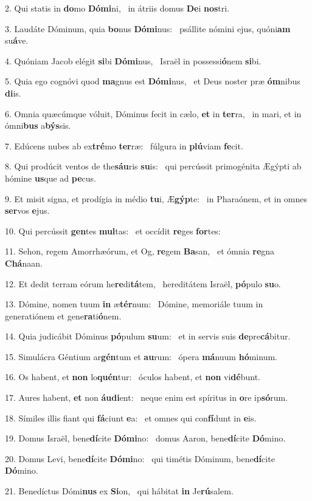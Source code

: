 2. Qui statis in \textbf{do}mo \textbf{Dó}\textbf{mi}ni, \ast\  in átriis domus \textbf{De}i \textbf{nos}tri.\

3. Laudáte Dóminum, quia \textbf{bo}nus \textbf{Dó}\textbf{mi}nus: \ast\  psállite nómini ejus, quóni\textbf{am} su\textbf{á}ve.\

4. Quóniam Jacob elégit \textbf{si}bi \textbf{Dó}\textbf{mi}nus, \ast\  Israël in possessi\textbf{ó}nem \textbf{si}bi.\

5. Quia ego cognóvi quod \textbf{ma}gnus est \textbf{Dó}\textbf{mi}nus, \ast\  et Deus noster præ \textbf{óm}nibus \textbf{di}is.\

6. Omnia quæcúmque vóluit, Dóminus fecit in cælo, \textbf{et} in \textbf{ter}ra, \ast\  in mari, et in ómni\textbf{bus} a\textbf{býs}sis.\

7. Edúcens nubes ab ex\textbf{tré}mo \textbf{ter}ræ: \ast\  fúlgura in \textbf{plú}viam \textbf{fe}cit.\

8. Qui prodúcit ventos de the\textbf{sáu}ris \textbf{su}is: \ast\  qui percússit primogénita Ægýpti ab hómine \textbf{us}que ad \textbf{pe}cus.\

9. Et misit signa, et prodígia in médio \textbf{tu}i, Æ\textbf{gýp}te: \ast\  in Pharaónem, et in omnes \textbf{ser}vos \textbf{e}jus.\

10. Qui percússit \textbf{gen}tes \textbf{mul}tas: \ast\  et occídit \textbf{re}ges \textbf{for}tes:\

11. Sehon, regem Amorrhæórum, et Og, \textbf{re}gem \textbf{Ba}san, \ast\  et ómnia \textbf{re}gna \textbf{Chá}naan.\

12. Et dedit terram eórum he\textbf{re}di\textbf{tá}tem, \ast\  hereditátem Israël, \textbf{pó}pulo \textbf{su}o.\

13. Dómine, nomen tuum \textbf{in} æ\textbf{tér}num: \ast\  Dómine, memoriále tuum in generatiónem et gene\textbf{ra}ti\textbf{ó}nem.\

14. Quia judicábit Dóminus \textbf{pó}pulum \textbf{su}um: \ast\  et in servis suis \textbf{de}pre\textbf{cá}bitur.\

15. Simulácra Géntium ar\textbf{gén}tum et \textbf{au}rum: \ast\  ópera \textbf{má}nuum \textbf{hó}minum.\

16. Os habent, et \textbf{non} lo\textbf{quén}tur: \ast\  óculos habent, et \textbf{non} vi\textbf{dé}bunt.\

17. Aures habent, \textbf{et} non \textbf{áu}\textbf{di}ent: \ast\  neque enim est spíritus in \textbf{o}re ip\textbf{só}rum.\

18. Símiles illis fiant qui \textbf{fá}ciunt \textbf{e}a: \ast\  et omnes qui con\textbf{fí}dunt in \textbf{e}is.\

19. Domus Israël, bene\textbf{dí}cite \textbf{Dó}\textbf{mi}no: \ast\  domus Aaron, bene\textbf{dí}cite \textbf{Dó}mino.\

20. Domus Levi, bene\textbf{dí}cite \textbf{Dó}\textbf{mi}no: \ast\  qui timétis Dóminum, bene\textbf{dí}cite \textbf{Dó}mino.\

21. Benedíctus Dómi\textbf{nus} ex \textbf{Si}on, \ast\  qui hábitat \textbf{in} Je\textbf{rú}salem.\

